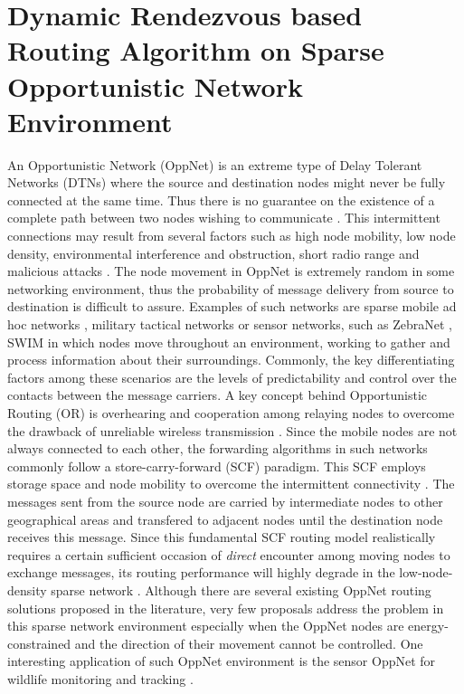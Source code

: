 \chapter{Dynamic Rendezvous based Routing Algorithm on Sparse Opportunistic Network Environment}
\label{DRRA}


An Opportunistic Network (OppNet) is an extreme type of Delay Tolerant Networks (DTNs) where the source and destination nodes might never be fully connected at the same time.
Thus there is no guarantee on the existence of a complete path between two nodes wishing to communicate \cite{MWNsBook2011}.
This intermittent connections may result from several factors such as high node mobility, low node density, environmental interference and obstruction, short radio range and malicious attacks \cite{prodhan2011}.
The node movement in OppNet is extremely random in some networking environment, thus the probability of message delivery from source to destination is difficult to assure.
Examples of such networks are sparse mobile ad hoc networks \cite{Alekeish2012}, military tactical networks \cite{Scott2005,Kerdsri2013} or sensor networks, such as ZebraNet \cite{zebranet2004}, SWIM \cite{Small2003}  in which nodes move throughout an environment, working to gather and process information about their surroundings.
Commonly, the key differentiating factors among these scenarios are the levels of predictability and control over the contacts between the message carriers\cite{Karkkainen2013}.
A key concept behind Opportunistic Routing (OR) is overhearing and cooperation among relaying nodes to overcome the drawback of unreliable wireless transmission \cite{Liu2009}.
Since the mobile nodes are not always connected to each other, the forwarding algorithms in such networks commonly follow a store-carry-forward (SCF) paradigm.
This SCF employs storage space and node mobility to overcome the intermittent connectivity \cite{Ma2011}.
The messages sent from the source node are carried by intermediate nodes to other geographical areas and transfered to adjacent nodes until the destination node receives this message.
Since this fundamental SCF routing model realistically requires a certain sufficient occasion of \emph{direct} encounter among moving nodes to exchange messages, its routing performance will highly degrade in the low-node-density sparse network \cite{Spyropoulos2010}.
Although there are several existing OppNet routing solutions \cite{ Zhang2013, Chung-Ming2008, Spyropoulos2004, Grossglauser2002, Vahdat2000,Kerdsri2013} proposed in the literature, very few proposals address the problem in this sparse network environment especially when the OppNet nodes are energy-constrained \cite{Liguang2013,Eu2010} and the direction of their movement cannot be controlled.
One interesting application of such OppNet environment is the sensor OppNet for wildlife monitoring and tracking \cite{zebranet2004, Small2003}.

